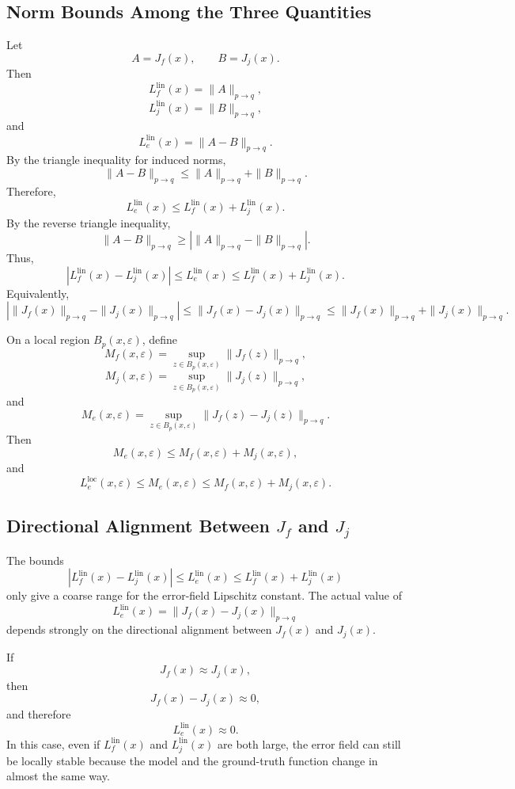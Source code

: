 \documentclass{article}
\begin{document}
\subsection{Norm Bounds Among the Three Quantities}

Let
\[
A=J_f(x),
\qquad
B=J_j(x).
\]
Then
\[
L_f^{\mathrm{lin}}(x)=\|A\|_{p\to q},
\]
\[
L_j^{\mathrm{lin}}(x)=\|B\|_{p\to q},
\]
and
\[
L_e^{\mathrm{lin}}(x)=\|A-B\|_{p\to q}.
\]
By the triangle inequality for induced norms,
\[
\|A-B\|_{p\to q}
\le
\|A\|_{p\to q}
+
\|B\|_{p\to q}.
\]
Therefore,
\[
L_e^{\mathrm{lin}}(x)
\le
L_f^{\mathrm{lin}}(x)
+
L_j^{\mathrm{lin}}(x).
\]
By the reverse triangle inequality,
\[
\|A-B\|_{p\to q}
\ge
\left|
\|A\|_{p\to q}
-
\|B\|_{p\to q}
\right|.
\]
Thus,
\[
\left|
L_f^{\mathrm{lin}}(x)
-
L_j^{\mathrm{lin}}(x)
\right|
\le
L_e^{\mathrm{lin}}(x)
\le
L_f^{\mathrm{lin}}(x)
+
L_j^{\mathrm{lin}}(x).
\]
Equivalently,
\[
\boxed{
\left|
\|J_f(x)\|_{p\to q}
-
\|J_j(x)\|_{p\to q}
\right|
\le
\|J_f(x)-J_j(x)\|_{p\to q}
\le
\|J_f(x)\|_{p\to q}
+
\|J_j(x)\|_{p\to q}
}.
\]

On a local region \(B_p(x,\varepsilon)\), define
\[
M_f(x,\varepsilon)
=
\sup_{z\in B_p(x,\varepsilon)}
\|J_f(z)\|_{p\to q},
\]
\[
M_j(x,\varepsilon)
=
\sup_{z\in B_p(x,\varepsilon)}
\|J_j(z)\|_{p\to q},
\]
and
\[
M_e(x,\varepsilon)
=
\sup_{z\in B_p(x,\varepsilon)}
\|J_f(z)-J_j(z)\|_{p\to q}.
\]
Then
\[
M_e(x,\varepsilon)
\le
M_f(x,\varepsilon)+M_j(x,\varepsilon),
\]
and
\[
L_e^{\mathrm{loc}}(x,\varepsilon)
\le
M_e(x,\varepsilon)
\le
M_f(x,\varepsilon)+M_j(x,\varepsilon).
\]

\subsection{Directional Alignment Between \(J_f\) and \(J_j\)}

The bounds
\[
\left|
L_f^{\mathrm{lin}}(x)
-
L_j^{\mathrm{lin}}(x)
\right|
\le
L_e^{\mathrm{lin}}(x)
\le
L_f^{\mathrm{lin}}(x)+L_j^{\mathrm{lin}}(x)
\]
only give a coarse range for the error-field Lipschitz constant. The actual value of
\[
L_e^{\mathrm{lin}}(x)
=
\|J_f(x)-J_j(x)\|_{p\to q}
\]
depends strongly on the directional alignment between \(J_f(x)\) and \(J_j(x)\).

If
\[
J_f(x)\approx J_j(x),
\]
then
\[
J_f(x)-J_j(x)\approx 0,
\]
and therefore
\[
L_e^{\mathrm{lin}}(x)\approx 0.
\]
In this case, even if \(L_f^{\mathrm{lin}}(x)\) and \(L_j^{\mathrm{lin}}(x)\) are both large, the error field can still be locally stable because the model and the ground-truth function change in almost the same way.
\end{document}
